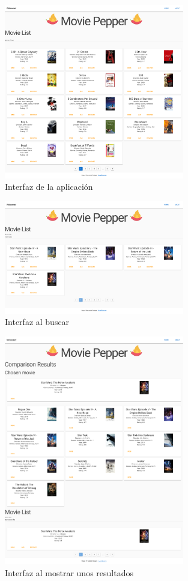 \documentclass[withindex, glossary]{cam-thesis}
\begin{document}
\begin{figure}
    \includegraphics[width=0.7\textwidth]{./figures/int.png}
    \caption{Interfaz de la aplicación}
\end{figure}
\begin{figure}
    \includegraphics[width=0.7\textwidth]{./figures/int_search.png}
    \caption{Interfaz al buscar}
\end{figure}
\begin{figure}
    \includegraphics[width=0.7\textwidth]{./figures/int_res.png}
    \caption{Interfaz al mostrar unos resultados}
\end{figure}
\end{document}
